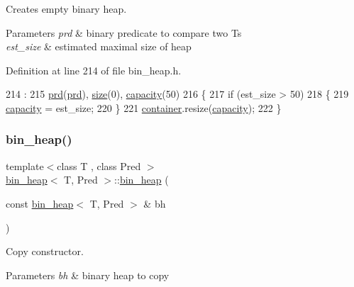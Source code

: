 Creates empty binary heap. 


\begin{DoxyParams}{Parameters}
{\em prd} & binary predicate to compare two {\ttfamily Ts} \\
\hline
{\em est\+\_\+size} & estimated maximal size of heap \\
\hline
\end{DoxyParams}


Definition at line 214 of file bin\+\_\+heap.\+h.


\begin{DoxyCode}
214                                                                :
215     \mbox{\hyperlink{classbin__heap_a5ecc420dfd03a6a0b4c9328cac1fae14}{prd}}(\mbox{\hyperlink{classbin__heap_a5ecc420dfd03a6a0b4c9328cac1fae14}{prd}}), \mbox{\hyperlink{classbin__heap_a8dde1008dcc24d734dbdb2c7ca50435b}{size}}(0), \mbox{\hyperlink{classbin__heap_ac5aa6948898bfc047cae2fe99ba28f57}{capacity}}(50)
216 \{
217     \textcolor{keywordflow}{if} (est\_size > 50)
218     \{
219     \mbox{\hyperlink{classbin__heap_ac5aa6948898bfc047cae2fe99ba28f57}{capacity}} = est\_size;
220     \}
221     \mbox{\hyperlink{classbin__heap_a413200f4c6e24090c5e9a32184fc8857}{container}}.resize(\mbox{\hyperlink{classbin__heap_ac5aa6948898bfc047cae2fe99ba28f57}{capacity}});
222 \}
\end{DoxyCode}
\mbox{\label{classbin__heap_a19bd4241e097852ffda83b72557ffbdc}} 
\subsubsection{\texorpdfstring{bin\+\_\+heap()}{bin\_heap()}\hspace{0.1cm}{\footnotesize\ttfamily [3/3]}}
{\footnotesize\ttfamily template$<$class T , class Pred $>$ \\
\mbox{\hyperlink{classbin__heap}{bin\+\_\+heap}}$<$ T, Pred $>$\+::\mbox{\hyperlink{classbin__heap}{bin\+\_\+heap}} (\begin{DoxyParamCaption}\item[{const \mbox{\hyperlink{classbin__heap}{bin\+\_\+heap}}$<$ T, Pred $>$ \&}]{bh }\end{DoxyParamCaption})}



Copy constructor. 


\begin{DoxyParams}{Parameters}
{\em bh} & binary heap to copy \\
\hline
\end{DoxyParams}


